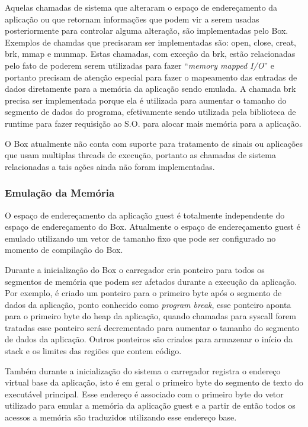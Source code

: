 \documentclass[11pt,twoside]{article}
\begin{document}
Aquelas chamadas de sistema que alteraram o espaço de endereçamento da aplicação
ou que retornam informações que podem vir a serem usadas posteriormente para
controlar alguma alteração, são implementadas pelo Box.  Exemplos de chamdas que
precisaram ser implementadas são: open, close, creat, brk, mmap e munmap. Estas
chamadas, com exceção da brk, estão relacionadas pelo fato de poderem serem
utilizadas para fazer ``\emph{memory mapped I/O}'' e portanto precisam de atenção
especial para fazer o mapeamento das entradas de dados diretamente para a
memória da aplicação sendo emulada. A chamada brk precisa ser implementada
porque ela é utilizada para aumentar o tamanho do segmento de dados do programa,
efetivamente sendo utilizada pela biblioteca de runtime para fazer requisição ao
S.O. para alocar mais memória para a aplicação.

O Box atualmente não conta com suporte para tratamento de sinais ou aplicações
que usam multiplas threads de execução, portanto as chamadas de sistema
relacionadas a tais ações ainda não foram implementadas.

\subsubsection{Emulação da Memória}

O espaço de endereçamento da aplicação guest é totalmente independente do espaço
de endereçamento do Box. Atualmente o espaço de endereçamento guest é emulado
utilizando um vetor de tamanho fixo que pode ser configurado no momento de
compilação do Box.

Durante a inicialização do Box o carregador cria ponteiro para todos os
segmentos de memória que podem ser afetados durante a execução da aplicação.
Por exemplo, é criado um ponteiro para o primeiro byte após o segmento de dados
da aplicação, ponto conhecido como \emph{program break}, esse ponteiro aponta
para o primeiro byte do heap da aplicação, quando chamadas para syscall forem
tratadas esse ponteiro será decrementado para aumentar o tamanho do segmento de
dados da aplicação. Outros ponteiros são criados para armazenar o início da
stack e os limites das regiões que contem código.

Também durante a inicialização do sistema o carregador registra o endereço
virtual base da aplicação, isto é em geral o primeiro byte do segmento de texto
do executável principal. Esse endereço é associado com o primeiro byte do vetor
utilizado para emular a memória da aplicação guest e a partir de então todos os
acessos a memória são traduzidos utilizando esse endereço base.
\end{document}
